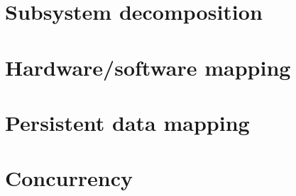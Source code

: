 \section{Subsystem decomposition}
\label{sec:subsystem}


\section{Hardware/software mapping}
\label{sec:hardsoftmap}


\section{Persistent data mapping}
\label{sec:datamap}


\section{Concurrency}
\label{sec:concur}

